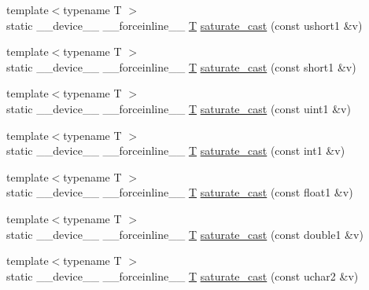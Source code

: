 \begin{DoxyCompactItemize}
\item 
{\footnotesize template$<$typename T $>$ }\\static \-\_\-\-\_\-device\-\_\-\-\_\- \-\_\-\-\_\-forceinline\-\_\-\-\_\- \hyperlink{calib3d_8hpp_a3efb9551a871ddd0463079a808916717}{T} \hyperlink{namespacecv_1_1gpu_1_1device_a70ea7688cef1117e46bf214ba87c1e90}{saturate\-\_\-cast} (const ushort1 \&v)
\item 
{\footnotesize template$<$typename T $>$ }\\static \-\_\-\-\_\-device\-\_\-\-\_\- \-\_\-\-\_\-forceinline\-\_\-\-\_\- \hyperlink{calib3d_8hpp_a3efb9551a871ddd0463079a808916717}{T} \hyperlink{namespacecv_1_1gpu_1_1device_acda225c74a2dc10d84591c277f88d3de}{saturate\-\_\-cast} (const short1 \&v)
\item 
{\footnotesize template$<$typename T $>$ }\\static \-\_\-\-\_\-device\-\_\-\-\_\- \-\_\-\-\_\-forceinline\-\_\-\-\_\- \hyperlink{calib3d_8hpp_a3efb9551a871ddd0463079a808916717}{T} \hyperlink{namespacecv_1_1gpu_1_1device_ae640b9f66c916463b7286d6a36186110}{saturate\-\_\-cast} (const uint1 \&v)
\item 
{\footnotesize template$<$typename T $>$ }\\static \-\_\-\-\_\-device\-\_\-\-\_\- \-\_\-\-\_\-forceinline\-\_\-\-\_\- \hyperlink{calib3d_8hpp_a3efb9551a871ddd0463079a808916717}{T} \hyperlink{namespacecv_1_1gpu_1_1device_a99877f2f8ccd48e3bb30a1df417a03dc}{saturate\-\_\-cast} (const int1 \&v)
\item 
{\footnotesize template$<$typename T $>$ }\\static \-\_\-\-\_\-device\-\_\-\-\_\- \-\_\-\-\_\-forceinline\-\_\-\-\_\- \hyperlink{calib3d_8hpp_a3efb9551a871ddd0463079a808916717}{T} \hyperlink{namespacecv_1_1gpu_1_1device_a598a69f83f0fe47a27e10f1629a88506}{saturate\-\_\-cast} (const float1 \&v)
\item 
{\footnotesize template$<$typename T $>$ }\\static \-\_\-\-\_\-device\-\_\-\-\_\- \-\_\-\-\_\-forceinline\-\_\-\-\_\- \hyperlink{calib3d_8hpp_a3efb9551a871ddd0463079a808916717}{T} \hyperlink{namespacecv_1_1gpu_1_1device_ae225d9213f2a3f3d4d1eacd318ce1105}{saturate\-\_\-cast} (const double1 \&v)
\item 
{\footnotesize template$<$typename T $>$ }\\static \-\_\-\-\_\-device\-\_\-\-\_\- \-\_\-\-\_\-forceinline\-\_\-\-\_\- \hyperlink{calib3d_8hpp_a3efb9551a871ddd0463079a808916717}{T} \hyperlink{namespacecv_1_1gpu_1_1device_a4127a3d27967bc7f96e566f362a7ceb0}{saturate\-\_\-cast} (const uchar2 \&v)

\end{DoxyCompactItemize}
